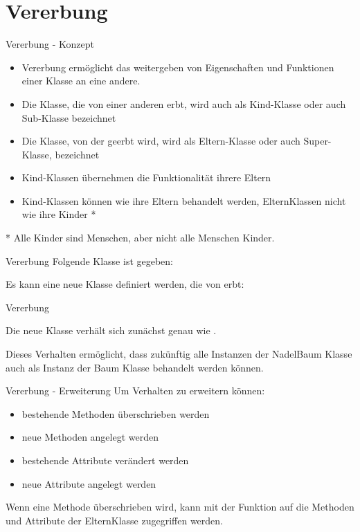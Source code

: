\section{Vererbung}
\begin{frame}{Vererbung - Konzept}
	\begin{itemize}
		\item Vererbung ermöglicht das weitergeben von Eigenschaften und Funktionen einer Klasse an eine andere.
		\item Die Klasse, die von einer anderen erbt, wird auch als \alert{Kind-Klasse} oder auch \alert{Sub-Klasse} bezeichnet
		\item Die Klasse, von der geerbt wird, wird als \alert{Eltern-Klasse} oder auch \alert{Super-Klasse}, bezeichnet
		\item Kind-Klassen übernehmen die Funktionalität ihrere Eltern
		\item Kind-Klassen können wie ihre Eltern behandelt werden, ElternKlassen nicht wie ihre Kinder *
	\end{itemize}
	* Alle Kinder sind Menschen, aber nicht alle Menschen Kinder.
\end{frame}

\begin{frame}{Vererbung}
	Folgende Klasse ist gegeben:
	
	Es kann eine neue Klasse definiert werden, die von  erbt:
	
\end{frame}

\begin{frame}{Vererbung}
	
	Die neue Klasse  verhält sich zunächst genau wie .
	
	Dieses Verhalten ermöglicht, dass zukünftig alle Instanzen der NadelBaum Klasse auch als Instanz der Baum Klasse behandelt werden können.
\end{frame}

\begin{frame}{Vererbung - Erweiterung}
	Um Verhalten zu erweitern können:
	\begin{itemize}
		\item bestehende Methoden überschrieben werden
		\item neue Methoden angelegt werden
		\item bestehende Attribute verändert werden
		\item neue Attribute angelegt werden
	\end{itemize}
	Wenn eine Methode überschrieben wird, kann mit der  Funktion
	auf die Methoden und Attribute der ElternKlasse zugegriffen werden.
	
\end{frame}

